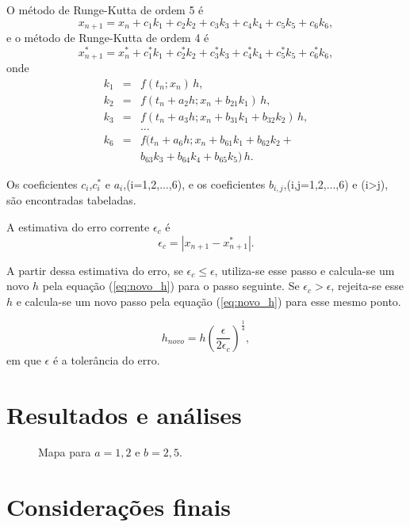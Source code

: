 \documentclass[brazilian, 12pt, a4paper, final]{article}
\begin{document}
\begin{multicols*}{2}
O método de Runge-Kutta de ordem 5 é
\begin{equation}
  x_{n+1}=x_n+c_1k_1+c_2k_2+c_3k_3+c_4k_4+c_5k_5+c_6k_6,
\end{equation}
e o  método de Runge-Kutta de ordem 4 é
\begin{equation}
  x_{n+1}^*=x_n^*+c_1^*k_1+c_2^*k_2+c_3^*k_3+c_4^*k_4+c_5^*k_5+c_6^*k_6,
\end{equation}
onde
\begin{eqnarray}
  k_1&=&f(t_n;x_n)\,h,\\
  k_2&=&f(t_n +a_2h;x_n+b_{21}k_1)\,h,\\
  k_3&=&f(t_n +a_3h;x_n+b_{31}k_1+b_{32}k_2)\,h,\\
  \nonumber & & \dots \\
  k_6&=&f(t_n+a_6h;x_n+b_{61}k_1+b_{62}k_2+\nonumber \\
     & &b_{63}k_3+b_{64}k_4+b_{65}k_5)\,h. 
\end{eqnarray}

Os coeficientes $c_i$,$c_i^*$ e $a_i$,(i=1,2,...,6), e os coeficientes $b_{i,j}$,(i,j=1,2,...,6) e (i>j), são encontradas tabeladas.

A estimativa do erro corrente $\epsilon_c$ é
\begin{equation}
  \epsilon_c=|x_{n+1}-x_{n+1}^*|.
\end{equation}

A partir dessa estimativa do erro,
se $\epsilon_c \le \epsilon$, utiliza-se esse passo e calcula-se um novo $h$ pela equação (\ref{eq:novo_h}) para o passo seguinte. Se $\epsilon_c > \epsilon$, rejeita-se esse $h$ e calcula-se um novo passo pela equação (\ref{eq:novo_h}) para esse mesmo ponto.

\begin{equation}\label{eq:novo_h}
  h_{novo}=h\left(\frac{\epsilon}{2\epsilon_c}\right)^{\frac{1}{4}},
\end{equation}
em que $\epsilon$ é a tolerância do erro.

\section{Resultados e análises}


\begin{figure}[H] 
  \centering
  \caption{Mapa para $a=1,2$ e $b=2,5$.}
  \label{fig:120}
\end{figure}


\section{Considerações finais}
 

\end{multicols*}
\end{document}
